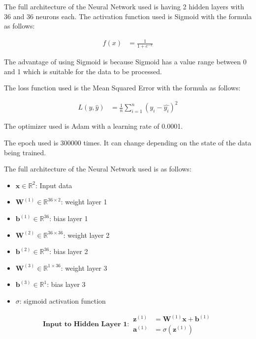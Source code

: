 The full architecture of the Neural Network used is having 2 hidden layers with 36 and 36 neurons each. The activation function used is Sigmoid with the formula as follows:

\begin{equation}
  \begin{aligned}
    f(x) &= \frac{1}{1 + e^{-x}}
  \end{aligned}
\end{equation}

The advantage of using Sigmoid is because Sigmoid has a value range between 0 and 1 which is suitable for the data to be processed.

The loss function used is the Mean Squared Error with the formula as follows:

\begin{equation}
  \begin{aligned}
    L(y, \hat{y}) &= \frac{1}{n} \sum_{i=1}^{n} (y_i - \hat{y_i})^2
  \end{aligned}
\end{equation}

The optimizer used is Adam with a learning rate of 0.0001.

The epoch used is 300000 times. It can change depending on the state of the data being trained.

The full architecture of the Neural Network used is as follows:

\begin{itemize}
    \item \( \mathbf{x} \in \mathbb{R}^2 \): Input data
    \item \( \mathbf{W}^{(1)} \in \mathbb{R}^{36 \times 2} \): weight layer 1
    \item \( \mathbf{b}^{(1)} \in \mathbb{R}^{36} \): bias layer 1
    \item \( \mathbf{W}^{(2)} \in \mathbb{R}^{36 \times 36} \): weight layer 2
    \item \( \mathbf{b}^{(2)} \in \mathbb{R}^{36} \): bias layer 2
    \item \( \mathbf{W}^{(3)} \in \mathbb{R}^{1 \times 36} \): weight layer 3
    \item \( \mathbf{b}^{(3)} \in \mathbb{R}^{1} \): bias layer 3
    \item \( \sigma \): sigmoid activation function
\end{itemize}

\begin{equation}
  \textbf{Input to Hidden Layer 1}:
  \begin{aligned}
    \mathbf{z}^{(1)} &= \mathbf{W}^{(1)} \mathbf{x} + \mathbf{b}^{(1)} \\
    \mathbf{a}^{(1)} &= \sigma(\mathbf{z}^{(1)})
  \end{aligned}
\end{equation}

